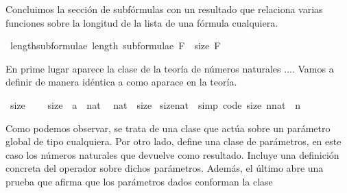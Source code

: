 \begin{isabellebody}
%
\begin{isamarkuptext}%
Concluimos la sección de subfórmulas con un resultado que relaciona varias funciones
sobre la longitud de la lista  de una fórmula  cualquiera.%
\end{isamarkuptext}\isamarkuptrue%
\isamarkupfalse%
\ length{\isacharunderscore}subformulae{\isacharcolon}\ {\isachardoublequoteopen}length\ {\isacharparenleft}subformulae\ F{\isacharparenright}\ {\isacharequal}\ size\ F{\isachardoublequoteclose}\ \isanewline
%
\isadelimproof
\ \ %
\endisadelimproof
%
\isatagproof
{}\isamarkupfalse%
%
\endisatagproof
{\isafoldproof}%
%
\isadelimproof
%
\endisadelimproof
%
\begin{isamarkuptext}%
En prime lugar aparece la clase  de la teoría de números naturales ....
Vamos a definir  de manera idéntica a como aparace  en la teoría.%
\end{isamarkuptext}\isamarkuptrue%
\isamarkupfalse%
\ size{}\ {\isacharequal}\isanewline
\ \ \ size{}\ {\isacharcolon}{\isacharcolon}\ {\isachardoublequoteopen}{\isacharprime}a\ {\isasymRightarrow}\ nat{\isachardoublequoteclose}\ \isanewline
\isanewline
{}\isamarkupfalse%
\ nat\ {\isacharcolon}{\isacharcolon}\ size{}\isanewline
{}\isanewline
\isanewline
{}\isamarkupfalse%
\ size{}{\isacharunderscore}nat\ \ {\isacharbrackleft}simp{\isacharcomma}\ code{\isacharbrackright}{\isacharcolon}\ {\isachardoublequoteopen}size{}\ {\isacharparenleft}n{\isacharcolon}{\isacharcolon}nat{\isacharparenright}\ {\isacharequal}\ n{\isachardoublequoteclose}\isanewline
\isanewline
{}\isamarkupfalse%
%
\isadelimproof
\ %
\endisadelimproof
%
\isatagproof
\isacommand{{\isachardot}{\isachardot}}\isamarkupfalse%
%
\endisatagproof
{\isafoldproof}%
%
\isadelimproof
%
\endisadelimproof
\isanewline
\isanewline
{}\isamarkupfalse%
%
\begin{isamarkuptext}%
Como podemos observar, se trata de una clase que actúa sobre un parámetro global
de tipo  cualquiera. Por otro lado,  define una clase de
parámetros, en este caso los números naturales  que devuelve como resultado. Incluye
una definición concreta del operador  sobre dichos parámetros. Además, el 
último  abre una prueba que afirma que los parámetros dados conforman la clase 

\end{isamarkuptext}
\end{isabellebody}
